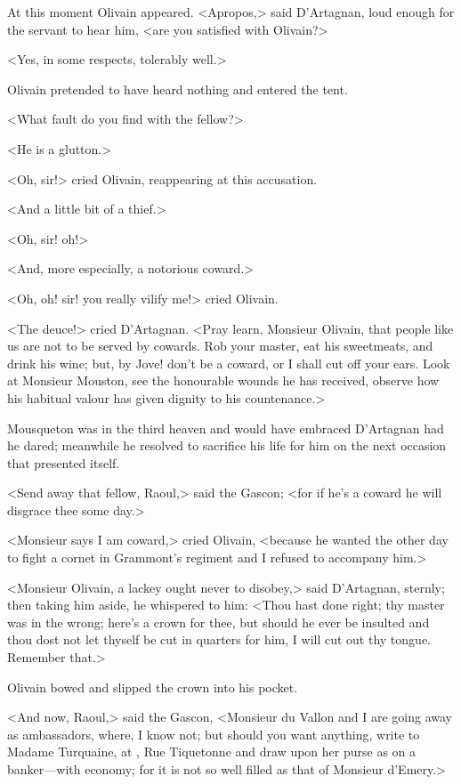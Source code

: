 At this moment Olivain appeared. <Apropos,> said D'Artagnan, loud enough for the servant to hear him, <are you satisfied with Olivain?>

<Yes, in some respects, tolerably well.>

Olivain pretended to have heard nothing and entered the tent.

<What fault do you find with the fellow?>

<He is a glutton.>

<Oh, sir!> cried Olivain, reappearing at this accusation.

<And a little bit of a thief.>

<Oh, sir! oh!>

<And, more especially, a notorious coward.>

<Oh, oh! sir! you really vilify me!> cried Olivain.

<The deuce!> cried D'Artagnan. <Pray learn, Monsieur Olivain, that people like us are not to be served by cowards. Rob your master, eat his sweetmeats, and drink his wine; but, by Jove! don't be a coward, or I shall cut off your ears. Look at Monsieur Mouston, see the honourable wounds he has received, observe how his habitual valour has given dignity to his countenance.>

Mousqueton was in the third heaven and would have embraced D'Artagnan had he dared; meanwhile he resolved to sacrifice his life for him on the next occasion that presented itself.

<Send away that fellow, Raoul,> said the Gascon; <for if he's a coward he will disgrace thee some day.>

<Monsieur says I am coward,> cried Olivain, <because he wanted the other day to fight a cornet in Grammont's regiment and I refused to accompany him.>

<Monsieur Olivain, a lackey ought never to disobey,> said D'Artagnan, sternly; then taking him aside, he whispered to him: <Thou hast done right; thy master was in the wrong; here's a crown for thee, but should he ever be insulted and thou dost not let thyself be cut in quarters for him, I will cut out thy tongue. Remember that.>

Olivain bowed and slipped the crown into his pocket.

<And now, Raoul,> said the Gascon, <Monsieur du Vallon and I are going away as ambassadors, where, I know not; but should you want anything, write to Madame Turquaine, at , Rue Tiquetonne and draw upon her purse as on a banker—with economy; for it is not so well filled as that of Monsieur d'Emery.>

